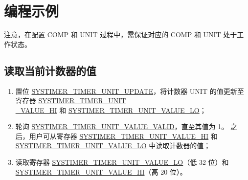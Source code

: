 \documentclass[main\_\_CN.tex]{subfiles}
\begin{document}
\section{编程示例}\label{sec:instructions-of-usage}
注意，在配置 COMP 和 UNIT 过程中，需保证对应的 COMP 和 UNIT 处于工作状态。
\subsection{读取当前计数器的值}\label{sec:to-read-system-timer-value}
\begin{enumerate}
    \item 置位 \hyperref[fielddesc:SYSTIMERTIMERUNIT0UPDATE]{SYSTIMER\_TIMER\_UNIT\_UPDATE}，将计数器 UNIT 的值更新至寄存器 \hyperref[fielddesc:SYSTIMERTIMERUNIT0VALUEHI]{SYSTIMER\_TIMER\_UNIT\\\_VALUE\_HI} 和 \hyperref[fielddesc:SYSTIMERTIMERUNIT0VALUELO]{SYSTIMER\_TIMER\_UNIT\_VALUE\_LO}；
    \item 轮询 \hyperref[fielddesc:SYSTIMERTIMERUNIT0VALUEVALID]{SYSTIMER\_TIMER\_UNIT\_VALUE\_VALID}，直至其值为 1。
    之后，用户可从寄存器 \hyperref[fielddesc:SYSTIMERTIMERUNIT0VALUEHI]{SYSTIMER\_TIMER\_UNIT\_VALUE\_HI} 和 \hyperref[fielddesc:SYSTIMERTIMERUNIT0VALUELO]{SYSTIMER\_TIMER\_UNIT\_VALUE\_LO} 中读取计数器的值；
    \item 读取寄存器 \hyperref[fielddesc:SYSTIMERTIMERUNIT0VALUELO]{SYSTIMER\_TIMER\_UNIT\_VALUE\_LO}（低 32 位）和 \hyperref[fielddesc:SYSTIMERTIMERUNIT0VALUEHI]{SYSTIMER\_TIMER\_UNIT\_VALUE\_HI}（高 20 位）。
\end{enumerate}
\end{document}
